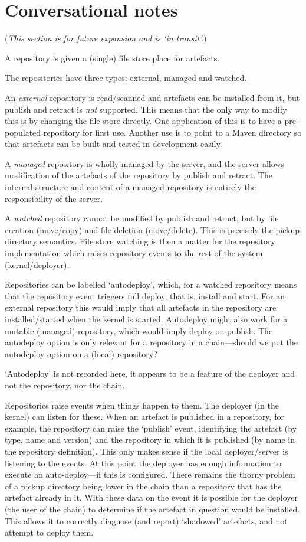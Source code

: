 \documentclass[a4paper,titlepage,twoside,12pt]{article}
\begin{document}
\section{Conversational notes}
(\emph{This section is for future expansion and is `in transit'.})

A repository is given a (single) file store place for artefacts.

The repositories have three types:  external, managed and watched.

An \emph{external} repository is read/scanned and artefacts can be installed from it, but publish and retract is \emph{not} supported. This means that the only way to modify this is by changing the file store directly. One application of this is to have a pre-populated repository for first use. Another use is to point to a Maven directory so that artefacts can be built and tested in development easily.

A \emph{managed} repository is wholly managed by the server, and the server allows modification of the artefacts of the repository by publish and retract.  The internal structure and content of a managed repository is entirely the responsibility of the server. 

A \emph{watched} repository cannot be modified by publish and retract, but by file creation (move/copy) and file deletion (move/delete). This is precisely the pickup directory semantics. File store watching is then a matter for the repository implementation which raises repository events to the rest of the system (kernel/deployer).

Repositories can be labelled `autodeploy', which, for a watched repository means that the repository event triggers full deploy, that is, install and start. For an external repository this would imply that all artefacts in the repository are installed/started when the kernel is started.  Autodeploy might also work for a mutable (managed) repository, which would imply deploy on publish. The autodeploy option is only relevant for a repository in a chain---should we put the autodeploy option on a (local) repository?

`Autodeploy' is not recorded here, it appears to be a feature of the deployer and not the repository, nor the chain.

Repositories raise events when things happen to them. The deployer (in the kernel) can listen for these. When an artefact is published in a repository, for example, the repository can raise the `publish' event, identifying the artefact (by type, name and version) and the repository in which it is published (by name in the repository definition). This only makes sense if the local deployer/server is listening to the events. At this point the deployer has enough information to execute an auto-deploy---if this is configured. There remains the thorny problem of a pickup directory being lower in the chain than a repository that has the artefact already in it. With these data on the event it is possible for the deployer (the user of the chain) to determine if the artefact in question would be installed. This allows it to correctly diagnose (and report) `shadowed' artefacts, and not attempt to deploy them.
\end{document}
